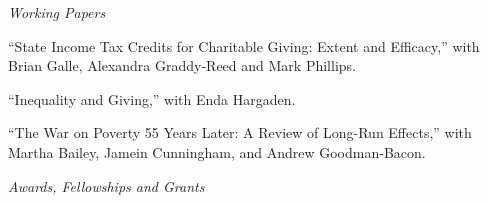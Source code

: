 \documentclass[12pt]{article}
\newcommand{\libertineSB}[1]{\textit{#1}}
\newcommand{\heading}[1]{
	{\setlength{\parskip}{0.8cm plus6mm minus3mm}
	\parindent=0pt
	\large \libertineSB{{#1}}}
	\vspace{0.1em}
}
\newenvironment{paperlist}{
	\begin{hangparas}{1em}{1}
	\raggedright \setlength{\parindent}{.3em} \setlength{\parskip}{6pt}
}{
	\end{hangparas}
}
\begin{document}
\heading{Working Papers}

\begin{paperlist}



``State Income Tax Credits for Charitable Giving: Extent and Efficacy,'' with Brian Galle, Alexandra Graddy-Reed and Mark Phillips. 

``Inequality and Giving,'' with Enda Hargaden. 

``The War on Poverty 55 Years Later: A Review of Long-Run Effects,'' with Martha Bailey, Jamein Cunningham, and Andrew Goodman-Bacon.


\end{paperlist}



\heading{Awards, Fellowships and Grants}
\end{document}
